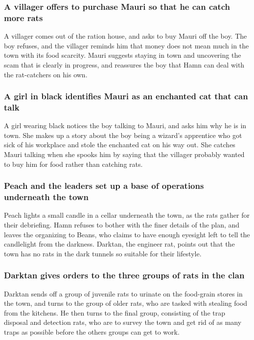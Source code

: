 \subsubsection{A villager offers to purchase \Gls{Mauri} so that he can catch more rats}
A villager comes out of the ration house, and asks to buy \Gls{Mauri} off the boy. The boy refuses,
and the villager reminds him that money does not mean much in the town with its food scarcity.
\Gls{Mauri} suggests staying in town and uncovering the scam that is clearly in progress, and
reassures the boy that \Gls{Hamn} can deal with the rat-catchers on his own.

\subsubsection{A girl in black identifies \Gls{Mauri} as an enchanted cat that can talk}
A girl wearing black notices the boy talking to \Gls{Mauri}, and asks him why he is in town. She
makes up a story about the boy being a wizard's apprentice who got sick of his workplace and stole
the enchanted cat on his way out. She catches \Gls{Mauri} talking when she spooks him by saying that
the villager probably wanted to buy him for food rather than catching rats.

\subsubsection{\Gls{Peach} and the leaders set up a base of operations underneath the town}
\Gls{Peach} lights a small candle in a cellar underneath the town, as the rats gather for their
debriefing. \Gls{Hamn} refuses to bother with the finer details of the plan, and leaves the
organizing to \Gls{Beans}, who claims to have enough eyesight left to tell the candlelight from the
darkness. \Gls{Darktan}, the engineer rat, points out that the town has no rats in the dark tunnels
so suitable for their lifestyle.

\subsubsection{\Gls{Darktan} gives orders to the three groups of rats in the clan}
\Gls{Darktan} sends off a group of juvenile rats to urinate on the food-grain stores in the town,
and turns to the group of older rats, who are tasked with stealing food from the kitchens. He then
turns to the final group, consisting of the trap disposal and detection rats, who are to survey the
town and get rid of as many traps as possible before the others groups can get to work.

